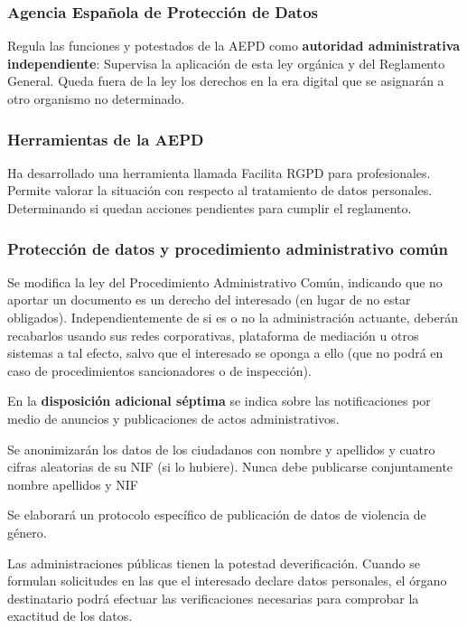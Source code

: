     \subsubsection{Agencia Española de Protección de Datos}
        Regula las funciones y potestados de la AEPD como \textbf{autoridad administrativa independiente}: Supervisa la aplicación de esta ley orgánica y del Reglamento General. Queda fuera de la ley los derechos en la era digital que se asignarán a otro organismo no determinado. 

    \subsubsection{Herramientas de la AEPD}
        Ha desarrollado una herramienta llamada Facilita RGPD para profesionales. Permite valorar la situación con respecto al tratamiento de datos personales. Determinando si quedan acciones pendientes para cumplir el reglamento.

    \subsubsection{Protección de datos y procedimiento administrativo común}
        Se modifica la ley del Procedimiento Administrativo Común, indicando que no aportar un documento es un derecho del interesado (en lugar de no estar obligados). Independientemente de si es o no la administración actuante, deberán recabarlos usando sus redes corporativas, plataforma de mediación u otros sistemas a tal efecto, salvo que el interesado se oponga a ello (que no podrá en caso de procedimientos sancionadores o de inspección).

        En la \textbf{disposición adicional séptima} se indica sobre las notificaciones por medio de anuncios y publicaciones de actos administrativos.

        Se anonimizarán los datos de los ciudadanos con nombre y apellidos y cuatro cifras aleatorias de su NIF (si lo hubiere). Nunca debe publicarse conjuntamente nombre apellidos y NIF

        Se elaborará un protocolo específico de publicación de datos de violencia de género.

        Las administraciones públicas tienen la potestad deverificación. Cuando se formulan solicitudes en las que el interesado declare datos personales, el órgano destinatario podrá efectuar las verificaciones necesarias para comprobar la exactitud de los datos.


